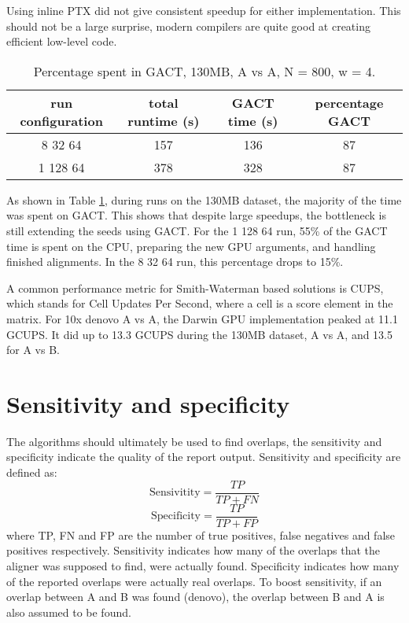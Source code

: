 \documentclass[../main/thesis.tex]{subfiles}
\begin{document}
Using inline PTX did not give consistent speedup for either implementation.
This should not be a large surprise, modern compilers are quite good at creating efficient low-level code.

\begin{table}
\centering
\label{tbl:darwin7}
\caption{Percentage spent in GACT, 130MB, A vs A, N = 800, w = 4.}
\begin{tabular}{c|c c c}
run configuration & total runtime (s) & GACT time (s) & percentage GACT \\ \hline
8 32 64 & 157 & 136 & 87 \\
1 128 64 & 378 & 328 & 87 \\
\end{tabular}
\end{table}

As shown in Table \ref{tbl:darwin7}, during runs on the 130MB dataset, the majority of the time was spent on GACT.
This shows that despite large speedups, the bottleneck is still extending the seeds using GACT.
For the 1 128 64 run, 55\% of the GACT time is spent on the CPU, preparing the new GPU arguments, and handling finished alignments.
In the 8 32 64 run, this percentage drops to 15\%.

A common performance metric for Smith-Waterman based solutions is CUPS, which stands for Cell Updates Per Second, where a cell is a score element in the matrix.
For 10x denovo A vs A, the Darwin GPU implementation peaked at 11.1 GCUPS.
It did up to 13.3 GCUPS during the 130MB dataset, A vs A, and 13.5 for A vs B.


\section{Sensitivity and specificity}
The algorithms should ultimately be used to find overlaps, the sensitivity and specificity indicate the quality of the report output.
Sensitivity and specificity are defined as:
$$\text{Sensivitity} = \frac{TP}{TP + FN}$$
$$\text{Specificity} = \frac{TP}{TP + FP}$$
where TP, FN and FP are the number of true positives, false negatives and false positives respectively.
Sensitivity indicates how many of the overlaps that the aligner was supposed to find, were actually found.
Specificity indicates how many of the reported overlaps were actually real overlaps.
To boost sensitivity, if an overlap between A and B was found (denovo), the overlap between B and A is also assumed to be found.
\end{document}
